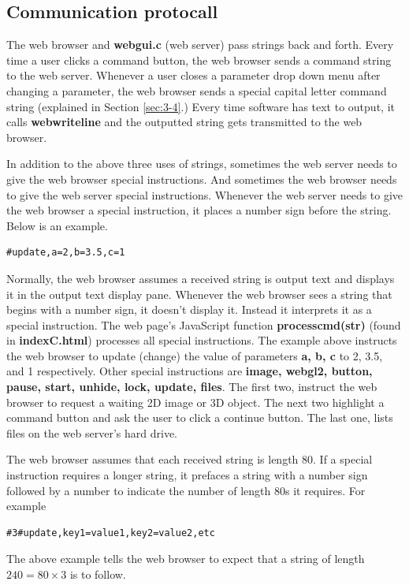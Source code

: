 \subsection{Communication protocall}

The web browser and \textbf{webgui.c} (web server) pass strings back and forth. Every time a user
clicks a command button, the web browser sends a command string to the web server. Whenever a user closes a parameter drop
down menu after changing a parameter, the web browser sends a special capital letter command string (explained in Section \ref{sec:3-4}.)
Every time software has text to output, it calls \textbf{webwriteline} and the outputted string gets transmitted to the web browser.

In addition to the above three uses of strings, sometimes the web server needs to give the web browser special instructions. And sometimes
the web browser needs to give the web server special instructions. Whenever the web server needs to give the web browser a special
instruction, it places a number sign before the string. Below is an example.
\begin{verbatim}
#update,a=2,b=3.5,c=1
\end{verbatim}
Normally, the web browser assumes a received string is output text and displays it in the output text display pane. Whenever
the web browser sees a string that begins with a number sign, it doesn't display it. Instead it interprets it as a special instruction.
The web page's JavaScript function \textbf{processcmd(str)} (found in \textbf{indexC.html}) processes all special instructions.
The example above instructs the web browser to update (change) the value of parameters \textbf{a, b, c} to 2, 3.5, and 1 respectively.
Other special instructions are \textbf{image, webgl2, button, pause, start, unhide, lock, update, files}. The first two, instruct the 
web browser to request a waiting 2D image or 3D object. The next two highlight a command button and ask the user to click a
continue button. The last one, lists files on the web server's hard drive.

The web browser assumes that each received string is length 80. 
If a special instruction requires a longer string, it prefaces a string with a 
number sign followed by a number to indicate the number of length 80s it requires. For example
\begin{verbatim}
#3#update,key1=value1,key2=value2,etc
\end{verbatim}
The above example tells the web browser to expect that a string of length $240 = 80 \times 3$ is to follow. 


